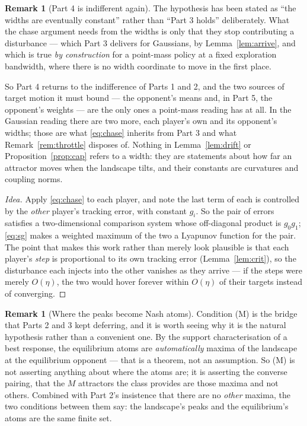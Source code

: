 \documentclass[11pt]{article}
\theoremstyle{definition}
\newtheorem{remark}[theorem]{Remark}
\begin{document}
\begin{remark}[Part 4 is indifferent again]\label{rem:part4family}
The hypothesis has been stated as ``the widths are eventually constant'' rather
than ``Part 3 holds'' deliberately. What the chase argument needs from the widths
is only that they stop contributing a disturbance --- which Part 3 delivers for
Gaussians, by Lemma~\ref{lem:arrive}, and which is true \emph{by construction} for
a point-mass policy at a fixed exploration bandwidth, where there is no width
coordinate to move in the first place.

So Part 4 returns to the indifference of Parts 1 and 2, and the two sources of
target motion it must bound --- the opponent's means and, in Part 5, the
opponent's weights --- are the only ones a point-mass reading has at all. In the
Gaussian reading there are two more, each player's own and its opponent's widths;
those are what \eqref{eq:chase} inherits from Part 3 and what
Remark~\ref{rem:throttle} disposes of. Nothing in Lemma~\ref{lem:drift} or
Proposition~\ref{prop:cap} refers to a width: they are statements about how far an
attractor moves when the landscape tilts, and their constants are curvatures and
coupling norms.
\end{remark}

\begin{proof}[Idea]
Apply \eqref{eq:chase} to each player, and note the last term of each is
controlled by the \emph{other} player's tracking error, with constant $g_i$. So
the pair of errors satisfies a two-dimensional comparison system whose off-diagonal
product is $g_0g_1$; \eqref{eq:sg} makes a weighted maximum of the two a Lyapunov
function for the pair. The point that makes this work rather than merely look
plausible is that each player's \emph{step} is proportional to its own tracking
error (Lemma~\ref{lem:crit}), so the disturbance each injects into the other
vanishes as they arrive --- if the steps were merely $O(\eta)$, the two would
hover forever within $O(\eta)$ of their targets instead of converging.
\end{proof}

\begin{remark}[Where the peaks become Nash atoms]\label{rem:M}
Condition (M) is the bridge that Parts 2 and 3 kept deferring, and it is worth
seeing why it is the natural hypothesis rather than a convenient one. By the
support characterisation of a best response, the equilibrium atoms are
\emph{automatically} maxima of the landscape at the equilibrium opponent --- that
is a theorem, not an assumption. So (M) is not asserting anything about where the
atoms are; it is asserting the converse pairing, that the $M$ attractors the class
provides are those maxima and not others. Combined with Part 2's insistence that
there are no \emph{other} maxima, the two conditions between them say: the
landscape's peaks and the equilibrium's atoms are the same finite set.
\end{remark}
\end{document}
